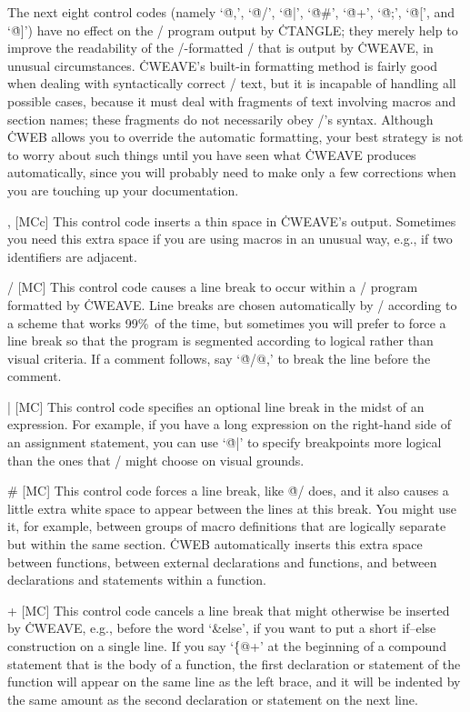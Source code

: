 \subsec
The next eight control codes (namely `\.{@,}', `\.{@/}', `\.{@|}', `\.{@\#}',
`\.{@+}', `\.{@;}', `\.{@[}', and `\.{@]}') have no effect on the \CEE/
program output by \.{CTANGLE}; they merely help to improve the readability
of the \TEX/-formatted \CEE/ that is output by \.{CWEAVE}, in unusual
circumstances. \.{CWEAVE}'s built-in formatting method is fairly good
when dealing with syntactically correct \CEE/ text, but
it is incapable of handling all possible cases, because it must deal with
fragments of text involving macros and section names; these fragments do
not necessarily obey \CEE/'s syntax. Although \.{CWEB} allows you to
override the automatic formatting, your best strategy is not to worry
about such things until you have seen what \.{CWEAVE} produces automatically,
since you will probably need to make only a few corrections when you are
touching up your documentation.

\@, [MCc] This control code inserts a thin space in \.{CWEAVE}'s output.
Sometimes you need this extra space if you are using
macros in an unusual way, e.g., if two identifiers are adjacent.

\@/ [MC] This control code causes a line break to occur within a \CEE/
program formatted by \.{CWEAVE}. Line breaks
are chosen automatically by \TEX/ according to a scheme that works 99\%\
of the time, but sometimes you will prefer to force a line break so that
the program is segmented according to logical rather than visual
criteria. If a comment follows, say `\.{@/@,}' to break the line
before the comment.

\@| [MC] This control code specifies an optional line break in the midst of
an expression. For example, if you have
a long expression on the right-hand side of an assignment
statement, you can use `\.{@|}' to specify breakpoints more logical than
the ones that \TEX/ might choose on visual grounds.

\@\# [MC] This control code forces a line break, like \.{@/} does,
and it also causes a little extra white space to appear between the lines at
this break. You might use it, for example,
between groups of macro definitions that are logically separate but within
the same section. \.{CWEB} automatically inserts this extra space
between functions, between external declarations and functions, and
between declarations and statements within a function.

\@+ [MC] This control code cancels a line break that might otherwise be
inserted by \.{CWEAVE}, e.g., before the word `\&{else}', if you want to
put a short if--else construction on a single line.
If you say `\.{\{@+}' at the beginning of a compound statement
that is the body of a function, the first declaration or
statement of the function will appear on the same line as the
left brace, and it will be indented by the same amount as the
second declaration or statement on the next line.

